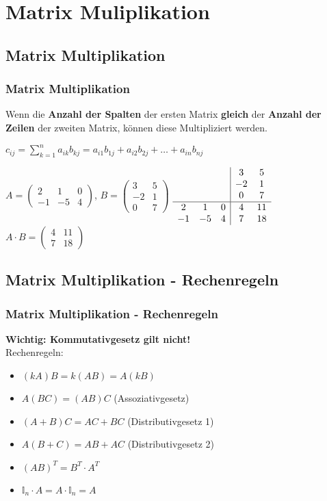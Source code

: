 \section{Matrix Muliplikation}
\subsection{Matrix Multiplikation}
\begin{frame}
\frametitle{Matrix Multiplikation}
Wenn die \textbf{Anzahl der Spalten} der ersten Matrix \textbf{gleich} der \textbf{Anzahl der Zeilen} der zweiten Matrix, können diese Multipliziert werden.

$c_{ij} = \sum_{k=1}^n a_{ik}b_{kj}= a_{i1}b_{1j} + a_{i2}b_{2j} + \dots + a_{in}b_{nj}$

$ A = \begin{pmatrix} 2 & 1 & 0 \\ -1 & -5 & 4 \end{pmatrix} $,
$ B = \begin{pmatrix} 3 & 5 \\ -2 & 1 \\ 0 & 7 \end{pmatrix} $
$
\begin{array}{c c c|c c}
& & & 3 & 5\\
& & & -2 & 1\\
& & & 0 & 7\\
\hline
2 & 1 & 0 & 4 & 11\\
-1 & -5 & 4 & 7 & 18\\
\end{array}
$
$ A \cdot B = \begin{pmatrix} 4 & 11 \\ 7 & 18 \end{pmatrix} $
\end{frame}

\subsection{Matrix Multiplikation - Rechenregeln}
\begin{frame}
\frametitle{Matrix Multiplikation - Rechenregeln}
\textbf{Wichtig: Kommutativgesetz gilt nicht!}\\
Rechenregeln:
\begin{itemize}
\item $(kA)B = k(AB) = A(kB)$
\item $A(BC) = (AB)C$ (Assoziativgesetz)
\item $(A+B)C = AC + BC$ (Distributivgesetz 1)
\item $A(B+C) = AB + AC$ (Distributivgesetz 2)
\item $(AB)^T = B^T \cdot A^T$
\item $\mathds{I}_n\cdot A = A\cdot \mathds{I}_n = A$
\end{itemize}
\end{frame}

